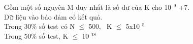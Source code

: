 Gồm một số nguyên M duy nhất là số dư của K cho 10 $^ 9 $ +7.
\\Dữ liệu vào bảo đảm có kết quả.
\\Trong 30\% số test có N  $\le$  500,  K  $\le$  5x10 $^ 5 $
\\Trong 50\% số test, K  $\le$  10 $^ 18 $